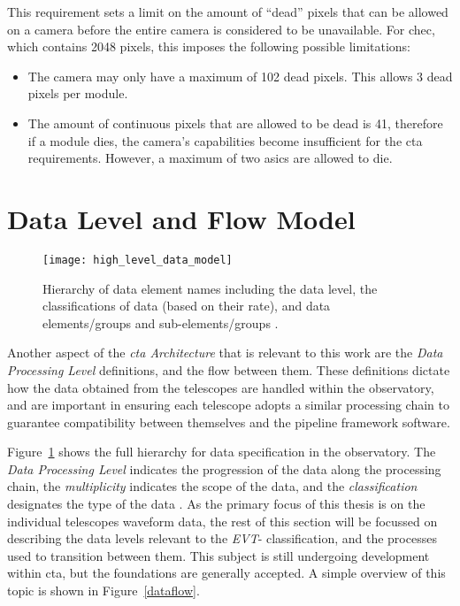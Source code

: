 This requirement sets a limit on the amount of ``dead'' pixels that can be allowed on a camera before the entire camera is considered to be unavailable. For \gls{chec}, which contains 2048 pixels, this imposes the following possible limitations:
\begin{itemize}
\item The camera may only have a maximum of 102 dead pixels. This allows 3 dead pixels per module.
\item The amount of continuous pixels that are allowed to be dead is 41, therefore if a module dies, the camera's capabilities become insufficient for the \gls{cta} requirements. However, a maximum of two \glspl{asic} are allowed to die.
\end{itemize}

\section{Data Level and Flow Model}

\begin{figure}
  \centering\texttt{[image: high\_level\_data\_model]} 
	\caption[High-level Data Model Hierarchy]{Hierarchy of data element names including the data level, the classifications of data (based on their rate), and data elements/groups and sub-elements/groups \cite{Kosack2017}.}
	\label{fig:high_level_data_model}
\end{figure}

Another aspect of the \textit{\gls{cta} Architecture} that is relevant to this work are the \textit{Data Processing Level} definitions, and the flow between them. These definitions dictate how the data obtained from the telescopes are handled within the observatory, and are important in ensuring each telescope adopts a similar processing chain to guarantee compatibility between themselves and the pipeline framework software.

Figure~\ref{fig:high_level_data_model} shows the full hierarchy for data specification in the observatory. The \textit{Data Processing Level} indicates the progression of the data along the processing chain, the \textit{multiplicity} indicates the scope of the data, and the \textit{classification} designates the type of the data \cite{Kosack2017}. As the primary focus of this thesis is on the individual telescopes waveform data, the rest of this section will be focussed on describing the data levels relevant to the \textit{EVT}- classification, and the processes used to transition between them. This subject is still undergoing development within \gls{cta}, but the foundations are generally accepted. A simple overview of this topic is shown in Figure~\ref{dataflow}.

